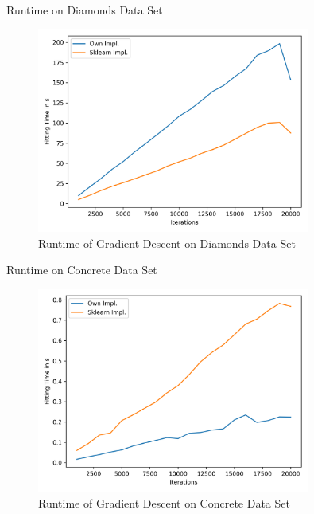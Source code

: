 \documentclass[10pt]{beamer}
\begin{document}
    \begin{frame}{Runtime on Diamonds Data Set}
        \begin{figure}[h!]
            \centering
            \includegraphics[width=0.8\textwidth]{exercise_2/presentation/figures/diamond_scores_runtime.png}
            \caption{Runtime of Gradient Descent on Diamonds Data Set}
            \label{fig:Grad_Diamond_runtime}
       \end{figure}
    \end{frame}
    
    \begin{frame}{Runtime on Concrete Data Set}
        \begin{figure}[h!]
            \centering
            \includegraphics[width=0.8\textwidth]{exercise_2/presentation/figures/concrete_gradient-descent_scores_runtime.png}
            \caption{Runtime of Gradient Descent on Concrete Data Set}
            \label{fig:Grad_Concrete_runtime}
       \end{figure}        
    \end{frame}
    
\end{document}
